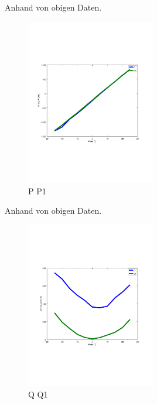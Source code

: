Anhand von obigen Daten.
\begin{figure}[!ht]
  \begin{center}
  \includegraphics[width=0.5\textwidth, trim={1cm 6.5cm 2cm 7cm},clip]{pic/6_1_grundfrequenztaktung/6_1_2_einst_wirk_und_blindleistung/P_P1.pdf}
  \caption{P P1}
  \label{fig:6_1_2_2}
  \end{center}
\end{figure}


Anhand von obigen Daten.
\begin{figure}[!ht]
  \begin{center}
  \includegraphics[width=0.5\textwidth, trim={1cm 6.5cm 2cm 7cm},clip]{pic/6_1_grundfrequenztaktung/6_1_2_einst_wirk_und_blindleistung/Q_Q1.pdf}
  \caption{Q Q1}
  \label{fig:6_1_2_3}
  \end{center}
\end{figure}



\clearpage